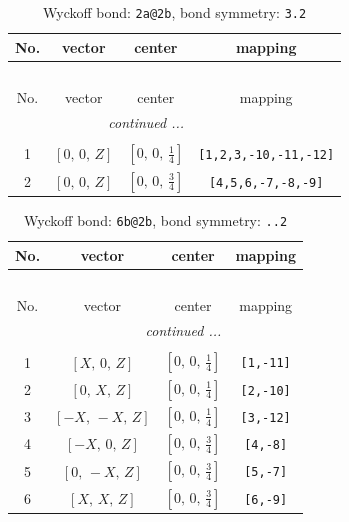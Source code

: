 \documentclass[fleqn,8pt]{jsarticle}
\begin{document}
\begin{longtable}{cccc}
\caption{Wyckoff bond: {\tt 2a@2b}, bond symmetry: {\tt 3.2}}
 \\
 \hline \hline
No. & vector & center & mapping \\ \hline \endfirsthead

\multicolumn{3}{l}{\tablename\ \thetable{}} \\
 \hline \hline
No. & vector & center & mapping \\ \hline \endhead

 \hline \hline
\multicolumn{3}{r}{\footnotesize\it continued ...} \\ \endfoot

 \hline \hline
\multicolumn{3}{r}{} \\ \endlastfoot

1 & $\left[ 0,\, 0,\, Z \right]$ & $\left[ 0,\, 0,\, \frac{1}{4} \right]$ & {\tt [1,2,3,-10,-11,-12]} \\ \hline
2 & $\left[ 0,\, 0,\, Z \right]$ & $\left[ 0,\, 0,\, \frac{3}{4} \right]$ & {\tt [4,5,6,-7,-8,-9]} \\
\end{longtable}
\renewcommand{\arraystretch}{1.2}
\begin{longtable}{cccc}
\caption{Wyckoff bond: {\tt 6b@2b}, bond symmetry: {\tt ..2}}
 \\
 \hline \hline
No. & vector & center & mapping \\ \hline \endfirsthead

\multicolumn{3}{l}{\tablename\ \thetable{}} \\
 \hline \hline
No. & vector & center & mapping \\ \hline \endhead

 \hline \hline
\multicolumn{3}{r}{\footnotesize\it continued ...} \\ \endfoot

 \hline \hline
\multicolumn{3}{r}{} \\ \endlastfoot

1 & $\left[ X,\, 0,\, Z \right]$ & $\left[ 0,\, 0,\, \frac{1}{4} \right]$ & {\tt [1,-11]} \\ \hline
2 & $\left[ 0,\, X,\, Z \right]$ & $\left[ 0,\, 0,\, \frac{1}{4} \right]$ & {\tt [2,-10]} \\ \hline
3 & $\left[ - X,\, - X,\, Z \right]$ & $\left[ 0,\, 0,\, \frac{1}{4} \right]$ & {\tt [3,-12]} \\ \hline
4 & $\left[ - X,\, 0,\, Z \right]$ & $\left[ 0,\, 0,\, \frac{3}{4} \right]$ & {\tt [4,-8]} \\ \hline
5 & $\left[ 0,\, - X,\, Z \right]$ & $\left[ 0,\, 0,\, \frac{3}{4} \right]$ & {\tt [5,-7]} \\ \hline
6 & $\left[ X,\, X,\, Z \right]$ & $\left[ 0,\, 0,\, \frac{3}{4} \right]$ & {\tt [6,-9]} \\
\end{longtable}
\end{document}
